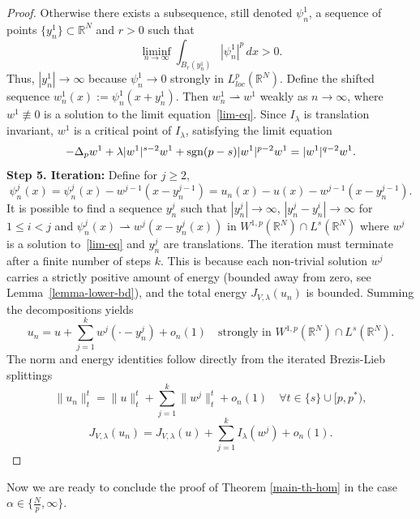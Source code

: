 \documentclass[11pt,reqno]{amsart}
\theoremstyle{definition}
\numberwithin{equation}{section}
\numberwithin{theorem}{section}
\numberwithin{equation}{section}
\numberwithin{theorem}{section}
\newcommand{\rn}{\mathbb{R}^N}
\newcommand{\R}{\mathbb{R}}
\begin{document}
\begin{proof}
Otherwise there exists a subsequence, still denoted $\psi^1_n$, a sequence of points $\{y_n^1\} \subset \mathbb{R}^N$ and $r > 0$ such that
$$\liminf_{n \to \infty} \int_{B_r(y_n^1)} |\psi_n^1|^p \, dx > 0.$$
Thus, $|y_n^1| \to \infty$ because $\psi_n^1 \to 0$ strongly in $L^p_{loc}(\R^N)$. Define the shifted sequence $w_n^1(x) := \psi_n^1(x + y_n^1)$. Then $w_n^1 \rightharpoonup w^1$ weakly as $n\to\infty$, where $w^1 \not\equiv 0$ is a solution to the limit equation~\eqref{lim-eq}. Since $I_\lambda$ is translation invariant, $w^1$ is a critical point of $I_\lambda$, satisfying the limit equation
$$-\Delta_p w^1 + \lambda |w^1|^{s-2}w^1 +{\rm sgn}(p-s) |w^1|^{p-2} w^1 = |w^1|^{q-2} w^1.$$
{\bf Step 5. Iteration:} Define for $j\ge 2$, $$\psi_n^j(x) = \psi_n^j(x) - w^{j-1}(x - y_n^{j-1}) = u_n(x) - u(x) - w^{j-1}(x - y_n^{j-1}).$$
It is possible to find a sequence $y_n^j$ such that $|y_n^j|\to\infty$, $|y_n^j - y_n^i|\to\infty$ for $1\le i<j$ and $\psi_n^j(x)\rightharpoonup w^{j}(x-y_n^j(x))$ in $W^{1,p}(\rn)\cap L^s(\rn)$
where $w^j$ is a solution to~\eqref{lim-eq} and $y_n^j$ are translations. The iteration must terminate after a finite number of steps $k$. This is because each non-trivial solution $w^j$ carries a strictly positive amount of energy (bounded away from zero, see Lemma~\ref{lemma-lower-bd}), and the total energy $J_{V,\lambda}(u_n)$ is bounded.
Summing the decompositions yields
$$u_n = u + \sum_{j=1}^k w^j(\cdot - y_n^j) + o_n(1) \quad \text{strongly in } W^{1,p}(\rn) \cap L^s(\rn).$$
The norm and energy identities follow directly from the iterated Brezis-Lieb splittings
$$\|u_n\|_t^t = \|u\|_t^t + \sum_{j=1}^k \|w^j\|_t^t + o_n(1) \quad \forall t \in \{s\} \cup [p, p^*),$$
$$J_{V,\lambda}(u_n) = J_{V,\lambda}(u) + \sum_{j=1}^k I_\lambda(w^j) + o_n(1).$$
\end{proof}

Now we are ready to conclude the proof of Theorem \ref{main-th-hom} in the case $\alpha\in\{\frac{N}{p},\infty\}$.\\
\end{document}
